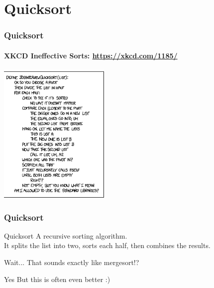 \section{Quicksort}
\label{sec:safe_the_best_for_last}


\begin{frame}
	\frametitle{Quicksort}
	\framesubtitle{XKCD Ineffective Sorts: \url{https://xkcd.com/1185/}}
	\begin{center}
		\includegraphics[width=0.4\textwidth]{figures/quicksort.png}\\
	\end{center}
\end{frame}

\begin{frame}
	\frametitle{Quicksort}
	\begin{block}{Quicksort}
		A recursive sorting algorithm.\\
		\pause
		It splits the list into two, sorts each half, then combines the results.
	\end{block}	
	\pause
	\begin{alertblock}{Wait...}
		That sounds exactly like mergesort!?
	\end{alertblock}	
	\pause
	\begin{exampleblock}{Yes}
		But this is often even better :)
	\end{exampleblock}	
\end{frame}

